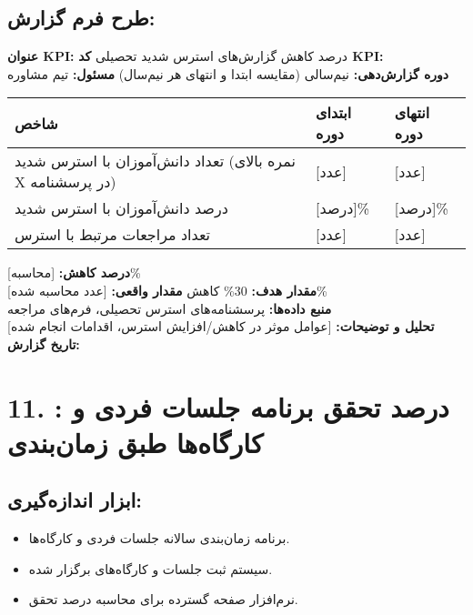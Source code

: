 \documentclass[11pt]{article}
\begin{document}
\subsection*{طرح فرم گزارش:}
\noindent\textbf{عنوان KPI:} درصد کاهش گزارش‌های استرس شدید تحصیلی \hfill \textbf{کد KPI:}  \\
\noindent\textbf{دوره گزارش‌دهی:} نیم‌سالی (مقایسه ابتدا و انتهای هر نیم‌سال) \hfill \textbf{مسئول:} تیم مشاوره \\

\bigskip
\begin{tabular}{lll}
\textbf{شاخص} & \textbf{ابتدای دوره} & \textbf{انتهای دوره} \\
\hline
تعداد دانش‌آموزان با استرس شدید (نمره بالای X در پرسشنامه) & {[عدد]} & {[عدد]} \\
درصد دانش‌آموزان با استرس شدید & {[درصد]\%} & {[درصد]\%} \\
تعداد مراجعات مرتبط با استرس & {[عدد]} & {[عدد]} \\
\end{tabular}
\bigskip

\noindent\textbf{درصد کاهش:} {[محاسبه]\%} \\
\noindent\textbf{مقدار هدف:} 30\% کاهش \hfill \textbf{مقدار واقعی:} {[عدد محاسبه شده]\%} \\
\noindent\textbf{منبع داده‌ها:} پرسشنامه‌های استرس تحصیلی، فرم‌های مراجعه \\
\noindent\textbf{تحلیل و توضیحات:} {[عوامل موثر در کاهش/افزایش استرس، اقدامات انجام شده]} \\
\noindent\textbf{تاریخ گزارش:} \\

\hrulefill
\bigskip

\section*{11. : درصد تحقق برنامه جلسات فردی و کارگاه‌ها طبق زمان‌بندی}

\subsection*{ابزار اندازه‌گیری:}
\begin{itemize}
    \item برنامه زمان‌بندی سالانه جلسات فردی و کارگاه‌ها.
    \item سیستم ثبت جلسات و کارگاه‌های برگزار شده.
    \item نرم‌افزار صفحه گسترده برای محاسبه درصد تحقق.
\end{itemize}
\end{document}
